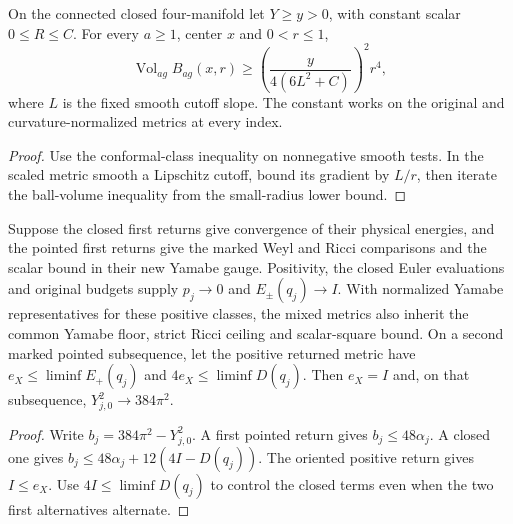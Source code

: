 \begin{proposition}
\label{prop:ed47-balls}
\leanok
On the connected closed four-manifold let $Y\ge y>0$, with constant
scalar $0\le R\le C$. For every $a\ge1$, center $x$ and $0<r\le1$,
\[
 \operatorname{Vol}_{a g} B_{a g}(x,r)\ge
 \left(\frac{y}{4(6L^2+C)}\right)^2 r^4,
\]
where $L$ is the fixed smooth cutoff slope. The constant works on the
original and curvature-normalized metrics at every index.
\end{proposition}
\begin{proof}
\leanok
Use the conformal-class inequality on nonnegative smooth tests. In the
scaled metric smooth a Lipschitz cutoff, bound its gradient by $L/r$,
then iterate the ball-volume inequality from the small-radius lower bound.
\end{proof}

\begin{proposition}
\label{prop:ed47-mixed}
\leanok
Suppose the closed first returns give convergence of their physical
energies, and the pointed first returns give the marked Weyl and Ricci
comparisons and the scalar bound in their new Yamabe gauge. Positivity,
the closed Euler evaluations and original budgets supply $p_j\to0$ and
$E_\pm(q_j)\to I$. With normalized Yamabe representatives for these positive classes, the mixed metrics also inherit the common Yamabe floor, strict Ricci ceiling and scalar-square bound. On a second marked pointed subsequence, let the
positive returned metric have $e_X\le\liminf E_+(q_j)$ and
$4e_X\le\liminf D(q_j)$. Then $e_X=I$ and, on that subsequence,
$Y_{j,0}^2\to384\pi^2$.
\end{proposition}
\begin{proof}
\leanok
Write $b_j=384\pi^2-Y_{j,0}^2$. A first pointed return gives
$b_j\le48\alpha_j$. A closed one gives
$b_j\le48\alpha_j+12(4I-D(q_j))$. The oriented positive return gives
$I\le e_X$. Use $4I\le\liminf D(q_j)$ to control the closed terms
even when the two first alternatives alternate.
\end{proof}


